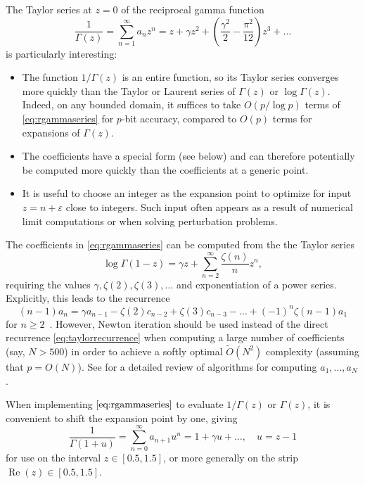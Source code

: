 \documentclass[reqno]{amsart}
\newcommand{\Real}{\operatorname{Re}}
\newcommand{\bigOtilde}{\widetilde O}
\theoremstyle{definition}
\begin{document}
The Taylor series at $z = 0$ of the reciprocal gamma function
\begin{equation}
\frac{1}{\Gamma(z)} = \sum_{n=1}^{\infty} a_n z^n = z + \gamma z^2 + \left(\frac{\gamma^2}{2} - \frac{\pi^2}{12}\right)z^3 + \ldots
\label{eq:rgammaseries}
\end{equation}
is particularly interesting:

\begin{itemize}
\item The function $1/\Gamma(z)$ is an entire function, so its Taylor series converges
more quickly than the Taylor or Laurent series of $\Gamma(z)$ or $\log \Gamma(z)$.
Indeed, on any bounded domain, it suffices to take $O(p / \log p)$ terms
of \eqref{eq:rgammaseries} for $p$-bit accuracy, compared to $O(p)$ terms for expansions of $\Gamma(z)$.
\item The coefficients have a special form (see below) and can therefore potentially be computed more quickly than the coefficients at a generic point.
\item It is useful to choose an integer as the expansion point to optimize for input $z = n + \varepsilon$ close to integers. Such input often appears as a result of numerical limit computations or when solving perturbation problems.
\end{itemize}

The coefficients in \eqref{eq:rgammaseries} can be computed from the
the Taylor series
\begin{equation}
\log \Gamma (1-z) = \gamma z + \sum_{n=2}^{\infty} \frac{\zeta(n)}{n} z^n,
\end{equation}
requiring the values $\gamma, \zeta(2), \zeta(3), \ldots$ and
exponentiation of a power series. Explicitly, this leads to
the recurrence
\begin{equation}
(n-1) a_n = \gamma a_{n-1} - \zeta(2) c_{n-2} + \zeta(3) c_{n-3} - \ldots + (-1)^{n} \zeta(n-1) a_1
\label{eq:taylorrecurrence}
\end{equation}
for $n \ge 2$~\cite{Wrench1968}. However,
Newton iteration should be used instead of the direct recurrence \eqref{eq:taylorrecurrence}
when computing a large number
of coefficients (say, $N > 500$) in order to achieve a softly optimal
$\bigOtilde(N^2)$ complexity (assuming that $p = O(N)$).
See \cite[Section 4.7]{Johansson2014thesis} for a detailed
review of algorithms for computing $a_1, \ldots, a_N$.

When implementing $\eqref{eq:rgammaseries}$ to evaluate $1/\Gamma(z)$ or $\Gamma(z)$,
it is convenient to shift the expansion point by one, giving
\begin{equation}
\frac{1}{\Gamma(1+u)} = \sum_{n=0}^{\infty} a_{n+1} u^n = 1 + \gamma u + \ldots, \quad u = z - 1
\end{equation}
for use on the interval $z \in [0.5, 1.5]$,
or more generally on the strip $\Real(z) \in [0.5, 1.5]$.
\end{document}
